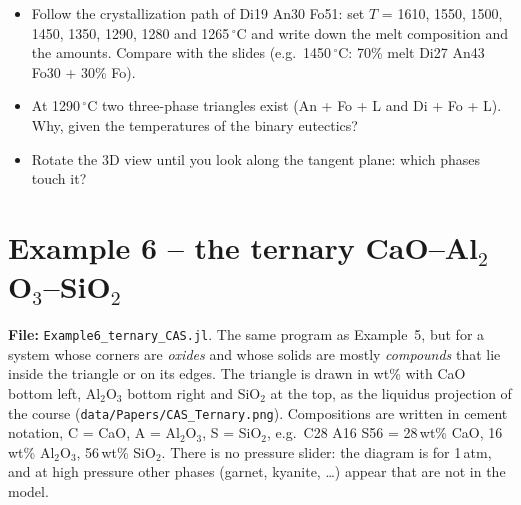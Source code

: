 \documentclass[11pt,a4paper]{article}
\newcommand{\file}[1]{\texttt{#1}}
\begin{document}
\begin{tryit}
\begin{itemize}
\item Follow the crystallization path of Di19 An30 Fo51: set $T$ = 1610, 1550, 1500, 1450, 1350, 1290, 1280 and
  1265\,$^\circ$C and write down the melt composition and the amounts. Compare with the slides
  (e.g.\ 1450\,$^\circ$C: 70\% melt Di27 An43 Fo30 + 30\% Fo).
\item At 1290\,$^\circ$C two three-phase triangles exist (An + Fo + L and Di + Fo + L). Why, given the
  temperatures of the binary eutectics?
\item Rotate the 3D view until you look along the tangent plane: which phases touch it?
\end{itemize}
\end{tryit}

\clearpage
\section{Example 6 – the ternary CaO–Al\texorpdfstring{$_2$}{2}O\texorpdfstring{$_3$}{3}–SiO\texorpdfstring{$_2$}{2}}\label{sec:ex6}
\textbf{File:} \file{Example6\_ternary\_CAS.jl}.\quad
The same program as Example~5, but for a system whose corners are \emph{oxides} and whose solids are mostly
\emph{compounds} that lie inside the triangle or on its edges. The triangle is drawn in wt\% with CaO bottom
left, Al$_2$O$_3$ bottom right and SiO$_2$ at the top, as the liquidus projection of the course
(\file{data/Papers/CAS\_Ternary.png}). Compositions are written in cement notation, C = CaO, A = Al$_2$O$_3$,
S = SiO$_2$, e.g.\ C28 A16 S56 = 28\,wt\% CaO, 16\,wt\% Al$_2$O$_3$, 56\,wt\% SiO$_2$. There is no pressure
slider: the diagram is for 1\,atm, and at high pressure other phases (garnet, kyanite, \dots) appear that
are not in the model.
\end{document}
